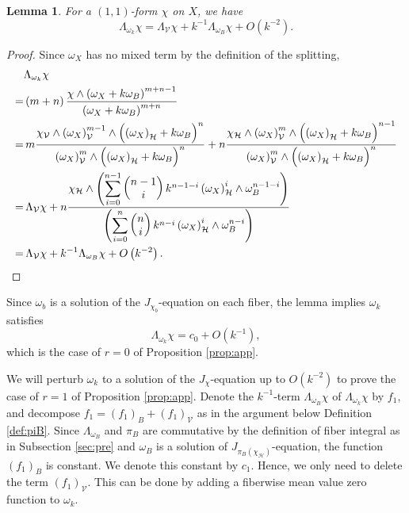 \documentclass{amsart}
\numberwithin{equation}{section}
\theoremstyle{plain}
\newtheorem{lemma}[equation]{Lemma}
\theoremstyle{definition}
\theoremstyle{remark}
\begin{document}
\begin{lemma}\label{lem:O(1)-term}
For a $(1,1)$-form $\chi$ on $X$, we have
$${\Lambda_{\omega_k}} \chi = \Lambda_\mathcal{V} \chi + k^{-1} {\Lambda_{\omega_B}} \chi + O \left(k^{-2} \right). $$
\end{lemma}

\begin{proof}
Since $\omega_X$ has no mixed term by the definition of the splitting,
\begin{align*}
&\Lambda_{\omega_k} \chi \\
=&\left( m+n \right) \frac{\chi \wedge \left( \omega_X + k \omega_B \right)^{m+n-1}}{\left( \omega_X + k \omega_B \right)^{m+n}} \\
=& \, m \frac
{ \chi_\mathcal{V} \wedge \left( \omega_X \right)_\mathcal{V}^{m-1} \wedge \Bigl( \left( \omega_X \right)_\mathcal{H} + k \omega_B \Bigr)^n}
{ \left( \omega_X \right)_\mathcal{V}^m \wedge \Bigl( \left( \omega_X \right)_\mathcal{H} + k \omega_B \Bigr)^n }
 + n \frac{ \chi_\mathcal{H}
  \wedge \left( \omega_X \right)_\mathcal{V}^m 
  \wedge \Bigl( \left( \omega_X \right)_\mathcal{H} + k \omega_B \Bigr)^{n-1}}
  { \left( \omega_X \right)_\mathcal{V}^m \wedge \Bigl( \left( \omega_X \right)_\mathcal{H} + k \omega_B \Bigr)^n} \\
=& \, \Lambda_\mathcal{V} \chi
   + n \frac{\chi_\mathcal{H} \wedge \left( {\displaystyle \sum_{i=0}^{n-1}} \begin{pmatrix} n-1 \\ i \end{pmatrix} k^{n-1-i} \left( \omega_X \right)_\mathcal{H}^i \wedge \omega_B^{n-1-i} \right)}
   { \left( {\displaystyle \sum_{i=0}^n} \begin{pmatrix} n \\i \end{pmatrix} k^{n-i} \left( \omega_X \right)_\mathcal{H}^i \wedge \omega_B^{n-i} \right)} \\
= & \, \Lambda_\mathcal{V} \chi + k^{-1} \Lambda_{\omega_B} \chi + O \left( k^{-2} \right).
\qedhere
\end{align*} 
\end{proof}

Since $\omega_b$ is a solution of the $J_{\chi_b}$-equation on each fiber, the lemma implies $\omega_k$ satisfies 
$$ \Lambda_{\omega_k} \chi = {c_0} + O(k^{-1}),$$ which is the case of $r = 0$ of Proposition \ref{prop:app}.

We will perturb $\omega_k$ to a solution of the $J_\chi$-equation up to $O(k^{-2})$ to prove the case of $r=1$ of Proposition \ref{prop:app}. 
Denote the $k^{-1}$-term $\Lambda_{\omega_B} \chi$ of $\Lambda_{\omega_k}\chi$
by $f_1$, and decompose $f_1 = \left( f_1 \right)_B + \left( f_1 \right)_\mathcal{V}$ as in the argument below Definition \ref{def:piB}. 
Since $\Lambda_{\omega_B}$ and $\pi_B$ are commutative by the definition of fiber integral as in Subsection \ref{sec:pre} and $\omega_B$ is a solution of $J_{\pi_B(\chi_\mathcal{H})}$-equation, the function $\left( f_1 \right)_B$ is constant. We denote this constant by $c_1$. Hence, we only need to delete the term $\left( f_1 \right)_\mathcal{V}$. 
This can be done by adding a fiberwise mean value zero function to $\omega_k$. 
\end{document}
